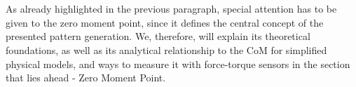 \\\\
As already highlighted in the previous paragraph, special attention has to be given to the zero moment point, since it defines the central concept of the presented pattern generation. We, therefore, will explain its theoretical foundations, as well as its analytical relationship to the CoM for simplified physical models, and ways to measure it with force-torque sensors in the section that lies ahead - Zero Moment Point.





 